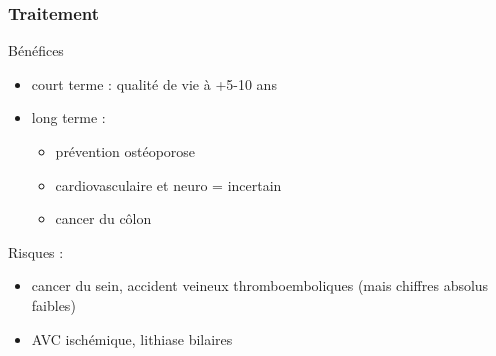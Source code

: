 \documentclass[11pt]{article}
\begin{document}
\subsubsection{Traitement}
\label{sec:org3700fae}
Bénéfices
\begin{itemize}
\item court terme : qualité de vie à +5-10 ans
\item long terme :
\begin{itemize}
\item prévention ostéoporose
\item cardiovasculaire et neuro = incertain
\item cancer du côlon
\end{itemize}
\end{itemize}
Risques :
\begin{itemize}
\item \inc cancer du sein, accident veineux thromboemboliques (mais chiffres absolus
faibles)
\item \inc AVC ischémique, lithiase bilaires
\end{itemize}
\end{document}
